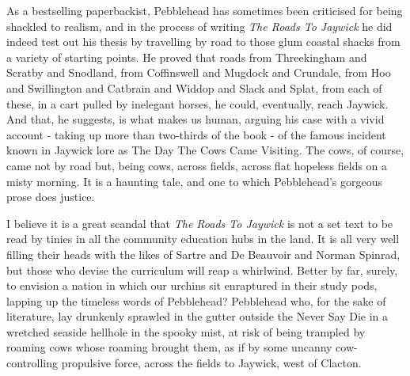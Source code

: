 As a bestselling paperbackist, Pebblehead has sometimes been criticised for being shackled to realism, and in the process of writing \emph{The Roads To Jaywick} he did indeed test out his thesis by travelling by road to those glum coastal shacks from a variety of starting points. He proved that roads from Threekingham and Scratby and Snodland, from Coffinswell and Mugdock and Crundale, from Hoo and Swillington and Catbrain and Widdop and Slack and Splat, from each of these, in a cart pulled by inelegant horses, he could, eventually, reach Jaywick. And that, he suggests, is what makes us human, arguing his case with a vivid account - taking up more than two-thirds of the book - of the famous incident known in Jaywick lore as The Day The Cows Came Visiting. The cows, of course, came not by road but, being cows, across fields, across flat hopeless fields on a misty morning. It is a haunting tale, and one to which Pebblehead's gorgeous prose does justice.

I believe it is a great scandal that \emph{The Roads To Jaywick} is not a set text to be read by tinies in all the community education hubs in the land. It is all very well filling their heads with the likes of Sartre and De Beauvoir and Norman Spinrad, but those who devise the curriculum will reap a whirlwind. Better by far, surely, to envision a nation in which our urchins sit enraptured in their study pods, lapping up the timeless words of Pebblehead? Pebblehead who, for the sake of literature, lay drunkenly sprawled in the gutter outside the Never Say Die in a wretched seaside hellhole in the spooky mist, at risk of being trampled by roaming cows whose roaming brought them, as if by some uncanny cow-controlling propulsive force, across the fields to Jaywick, west of Clacton.